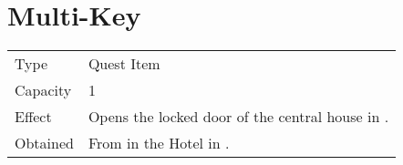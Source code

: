 \section{Multi-Key}
\label{item:multi_key}


\noindent\begin{tabularx}{\textwidth}[l]{lX}
	Type
	& Quest Item
\\
	Capacity
	& 1
\\
	Effect
	& Opens the locked door of the central house in \nameref{map:fireburg}.
\\
	Obtained
	& From \nameref{char:tristam} in the Hotel in \nameref{map:fireburg}.
\end{tabularx}
